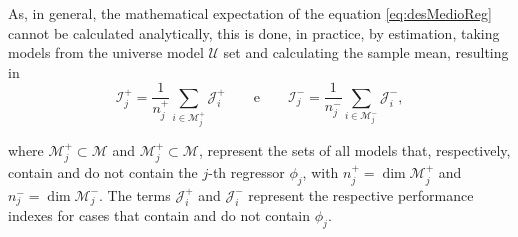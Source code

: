 As, in general, the mathematical expectation of the equation \eqref{eq:desMedioReg} cannot be calculated analytically, this is done, in practice, by estimation, taking models from the universe model $\mathscr{U}$ set and calculating the sample mean, resulting in
\begin{equation}
   \mathcal{I}^+_j = \frac{1}{n_j^+}\sum_{i \in \mathscr{M}_j^+}\mathcal{J}^{+}_{i} \qquad \text{e} \qquad \mathcal{I}^-_j = \frac{1}{n_j^-}\sum_{i \in \mathscr{M}_j^-}\mathcal{J}^{-}_{i},
\label{eq:avgRefPerf}
\end{equation}


where $ \mathscr{M}^+_j \subset \mathscr{M}$ and $ \mathscr{M}^+_j \subset \mathscr{M}$, represent the sets of all models that, respectively, contain and do not contain the $j$-th regressor $\phi_j$, with $n_j^+ = \dim \mathscr{M}^+_j $ and $n_j^- = \dim \mathscr{M}^-_j $. The terms $\mathcal{J}^{+}_{i}$ and $\mathcal{J}^{-}_{i}$ represent the respective performance indexes for cases that contain and do not contain $\phi_j$.



